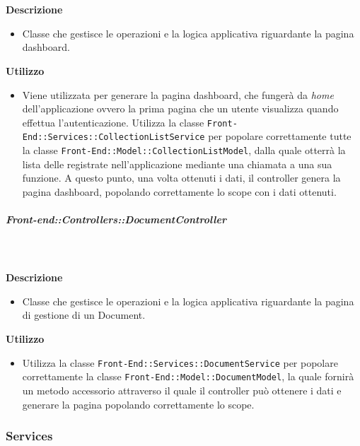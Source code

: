         \textbf{\\ \\ Descrizione} 
          \begin{itemize}
            \item[] Classe che gestisce le operazioni e la logica applicativa riguardante la pagina dashboard.
          \end{itemize}      
        \textbf{Utilizzo}  
          \begin{itemize}
            \item[] Viene utilizzata per generare la pagina dashboard, che fungerà da \textit{home} dell'applicazione ovvero la prima pagina che un utente visualizza quando effettua l'autenticazione. Utilizza la classe \texttt{Front-End::Services::CollectionListService} per popolare correttamente tutte la classe \texttt{Front-End::Model::CollectionListModel}, dalla quale otterrà la lista delle  registrate nell'applicazione mediante una chiamata a una sua funzione. A questo punto, una volta ottenuti i dati, il controller genera la pagina dashboard, popolando correttamente lo scope con i dati ottenuti.
          \end{itemize}
      \subparagraph{Front-end::Controllers::DocumentController}
        
        \textbf{\\ \\ Descrizione} 
          \begin{itemize}
            \item[] Classe che gestisce le operazioni e la logica applicativa riguardante la pagina di gestione di un Document.
          \end{itemize}      
        \textbf{Utilizzo}  
          \begin{itemize}
            \item[] Utilizza la classe \texttt{Front-End::Services::DocumentService} per popolare correttamente la classe \texttt{Front-End::Model::DocumentModel}, la quale fornirà un metodo accessorio attraverso il quale il controller può ottenere i dati e generare la pagina popolando correttamente lo scope.
          \end{itemize}
  \subsubsection{Services}
